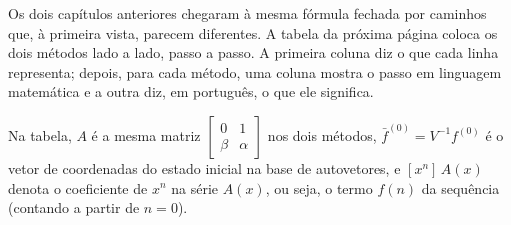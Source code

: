 
Os dois capítulos anteriores chegaram à mesma fórmula fechada por caminhos que, à primeira vista, parecem diferentes. A tabela da próxima página coloca os dois métodos lado a lado, passo a passo. A primeira coluna diz o que cada linha representa; depois, para cada método, uma coluna mostra o passo em linguagem matemática e a outra diz, em português, o que ele significa.

Na tabela, $A$ é a mesma matriz $\begin{bmatrix} 0 & 1 \\ \beta & \alpha \end{bmatrix}$ nos dois métodos, $\bar{f}^{(0)} = V^{-1} f^{(0)}$ é o vetor de coordenadas do estado inicial na base de autovetores, e $[x^n]\,A(x)$ denota o coeficiente de $x^n$ na série $A(x)$, ou seja, o termo $f(n)$ da sequência (contando a partir de $n = 0$).

